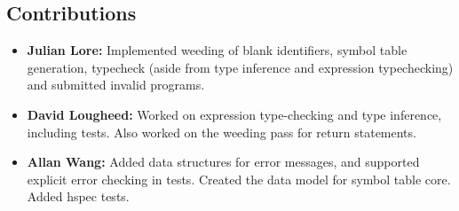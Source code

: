 \documentclass[11pt]{article}
\begin{document}
\subsection{Contributions}
\label{sec:orgdbc7af8}
\begin{itemize}
\item \textbf{Julian Lore:} Implemented weeding of blank identifiers, symbol
table generation, typecheck (aside from type inference and
expression typechecking) and submitted invalid programs.
\item \textbf{David Lougheed:} Worked on expression type-checking and type inference,
including tests. Also worked on the weeding pass for return
statements.
\item \textbf{Allan Wang:} Added data structures for error messages, and supported
explicit error checking in tests. Created the data model for
symbol table core. Added hspec tests.
\end{itemize}
\end{document}
